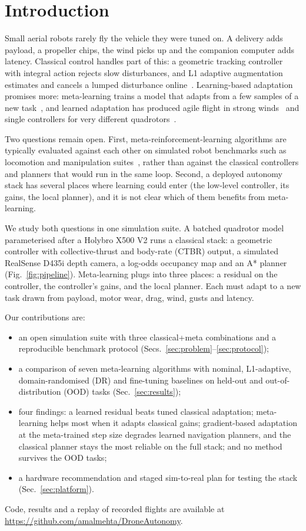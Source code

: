 \section{Introduction}

Small aerial robots rarely fly the vehicle they were tuned on. A delivery adds payload, a propeller chips, the wind picks up and the companion computer adds latency. Classical control handles part of this: a geometric tracking controller~\cite{lee2010geometric} with integral action rejects slow disturbances, and L1 adaptive augmentation estimates and cancels a lumped disturbance online~\cite{wu2022l1quad}. Learning-based adaptation promises more: meta-learning trains a model that adapts from a few samples of a new task~\cite{finn2017maml}, and learned adaptation has produced agile flight in strong winds~\cite{oconnell2022neuralfly} and single controllers for very different quadrotors~\cite{zhang2022nearhover,eschmann2025raptor}.

Two questions remain open. First, meta-reinforcement-learning algorithms are typically evaluated against each other on simulated robot benchmarks such as locomotion and manipulation suites~\cite{yu2019metaworld,beck2025tutorial}, rather than against the classical controllers and planners that would run in the same loop. Second, a deployed autonomy stack has several places where learning could enter (the low-level controller, its gains, the local planner), and it is not clear which of them benefits from meta-learning.

We study both questions in one simulation suite. A batched quadrotor model parameterised after a Holybro X500 V2 runs a classical stack: a geometric controller with collective-thrust and body-rate (CTBR) output, a simulated RealSense D435i depth camera, a log-odds occupancy map and an A* planner (Fig.~\ref{fig:pipeline}). Meta-learning plugs into three places: a residual on the controller, the controller's gains, and the local planner. Each must adapt to a new task drawn from payload, motor wear, drag, wind, gusts and latency.

Our contributions are:
\begin{itemize}
\item an open simulation suite with three classical+meta combinations and a reproducible benchmark protocol (Secs.~\ref{sec:problem}--\ref{sec:protocol});
\item a comparison of seven meta-learning algorithms with nominal, L1-adaptive, domain-randomised (DR) and fine-tuning baselines on held-out and out-of-distribution (OOD) tasks (Sec.~\ref{sec:results});
\item four findings: a learned residual beats tuned classical adaptation; meta-learning helps most when it adapts classical gains; gradient-based adaptation at the meta-trained step size degrades learned navigation planners, and the classical planner stays the most reliable on the full stack; and no method survives the OOD tasks;
\item a hardware recommendation and staged sim-to-real plan for testing the stack (Sec.~\ref{sec:platform}).
\end{itemize}
Code, results and a replay of recorded flights are available at \url{https://github.com/amalmehta/DroneAutonomy}.

